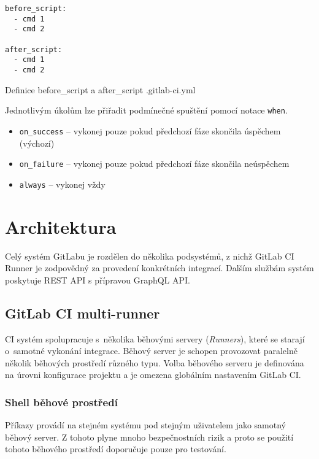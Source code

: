 \begin{listing}[ht]
\begin{verbatim}
before_script:
  - cmd 1
  - cmd 2

after_script:
  - cmd 1
  - cmd 2
\end{verbatim}
\caption{Definice before\_script a after\_script .gitlab-ci.yml}
\end{listing}

Jednotlivým úkolům lze přiřadit podmínečné spuštění pomocí notace \verb|when|.

\begin{itemize}
  \item \verb|on_success| -- vykonej pouze pokud předchozí fáze skončila úspěchem (výchozí) 
  \item \verb|on_failure| -- vykonej pouze pokud předchozí fáze skončila neúspěchem
  \item \verb|always| -- vykonej vždy
\end{itemize}

\section{Architektura}

Celý systém GitLabu je rozdělen do několika podsystémů, z nichž GitLab CI Runner je zodpovědný za provedení konkrétních integrací.
Dalším službám systém poskytuje REST API s přípravou GraphQL API.
\cite{gitlab_architecture}
\cite{gitlab_api}

\subsection{GitLab CI multi-runner}

CI systém spolupracuje s~několika běhovými servery (\textit{Runners}), které se starají o~samotné vykonání integrace.
Běhový server je schopen provozovat paralelně několik běhových prostředí různého typu.
Volba běhového serveru je definována na úrovni konfigurace projektu a je omezena globálním nastavením GitLab CI.


\subsubsection{Shell běhové prostředí}

Příkazy provádí na stejném systému pod stejným uživatelem jako samotný běhový server.
Z tohoto plyne mnoho bezpečnostních rizik a proto se použití tohoto běhového prostředí doporučuje pouze pro testování.

